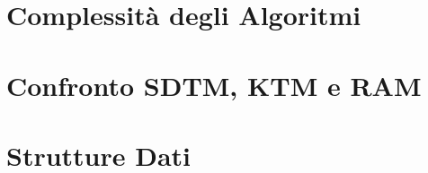 



\begin{titlepage}
    \maketitle
    \thispagestyle{empty}  %
\end{titlepage}

\section*{Complessità degli Algoritmi}


\section*{Confronto SDTM, KTM e RAM}


\section*{Strutture Dati}


% 

